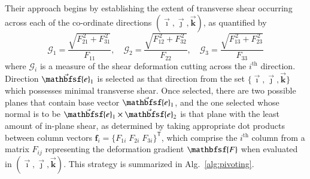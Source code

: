 Their approach begins by establishing the extent of transverse shear occurring across each of the co-ordinate directions $( \vec{\boldsymbol{\imath}} , \vec{\boldsymbol{\jmath}} , \vec{\boldsymbol{k}} )$, as quantified by
\begin{equation}
\mathcal{G}_1 =\dfrac{\sqrt{F^{\,2}_{21}+F^{\,2}_{31}}}{F_{11}} , \quad
\mathcal{G}_2 =\dfrac{\sqrt{F^{\,2}_{12}+F^{\,2}_{32}}}{F_{22}} , \quad
\mathcal{G}_3 =\dfrac{\sqrt{F^{\,2}_{13}+F^{\,2}_{23}}}{F_{33}}
\end{equation} 
where $\mathcal{G}_i$ is a measure of the shear deformation cutting across the $i^{\text{th}}$ direction.  Direction $\vec{\mathbfsf{e}}_1$ is selected as that direction from the set $\{ \vec{\boldsymbol{\imath}} , \vec{\boldsymbol{\jmath}} , \vec{\boldsymbol{k}} \}$ which possesses minimal transverse shear.  Once selected, there are two possible planes that contain base vector $\vec{\mathbfsf{e}}_1$, and the one selected whose normal is to be $\vec{\mathbfsf{e}}_1 \times \vec{\mathbfsf{e}}_2$ is that plane with the least amount of in-plane shear, as determined by taking appropriate dot products between column vectors $\boldsymbol{f}_i = \{ F_{1i} \; F_{2i} \; F_{3i} \}^{\mathsf{T}}$, which comprise the $i^{\text{th}}$ column from a matrix $F_{ij}$ representing the deformation gradient $\mathbfsf{F}$ when evaluated in $( \vec{\boldsymbol{\imath}} , \vec{\boldsymbol{\jmath}} , \vec{\boldsymbol{k}} )$.  This strategy is summarized in Alg.~\ref{alg:pivoting}.

